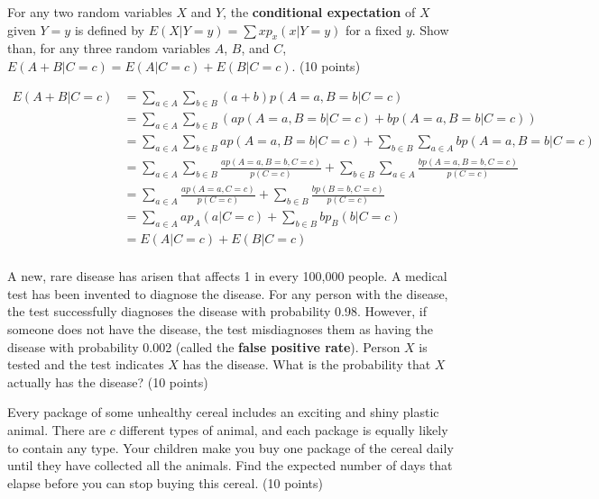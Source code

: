 \documentclass[fleqn]{homework}
\begin{document}
  \begin{problem}{3}
    \begin{question}
      For any two random variables $X$ and $Y$, the \textbf{conditional
        expectation} of $X$ given $Y=y$ is defined by
      $E(X|Y=y) = \sum x p_x(x|Y=y)$ for a fixed $y$.  Show than, for any three
      random variables $A$, $B$, and $C$, $E(A+B|C=c) = E(A|C=c) +
      E(B|C=c)$. (10 points)
    \end{question}

    \begin{align*}
      E(A + B | C=c) &= \sum_{a\in A} \sum_{b\in B} (a+b)p(A=a,B=b|C=c) \\
                     &= \sum_{a\in A} \sum_{b\in B} \left(a p(A=a,B=b|C=c) + b p(A=a,B=b|C=c) \right) \\
                     &= \sum_{a\in A} \sum_{b\in B} a p(A=a,B=b|C=c) + \sum_{b\in B} \sum_{a\in A} b p(A=a,B=b|C=c) \\
                     &= \sum_{a\in A} \sum_{b\in B} \frac{ap(A=a,B=b,C=c)}{p(C=c)} + \sum_{b\in B} \sum_{a\in A} \frac{bp(A=a,B=b,C=c)}{p(C=c)} \\
                     &= \sum_{a\in A} \frac{ap(A=a,C=c)}{p(C=c)} + \sum_{b\in B} \frac{bp(B=b,C=c)}{p(C=c)} \\
                     &= \sum_{a\in A} a p_A(a|C=c) + \sum_{b\in B} bp_B(b|C=c) \\
                     &= E(A|C=c) + E(B|C=c) \\
    \end{align*}
  \end{problem}

  \begin{problem}{4}
    \begin{question}
      A new, rare disease has arisen that affects 1 in every 100,000 people.  A
      medical test has been invented to diagnose the disease.  For any person
      with the disease, the test successfully diagnoses the disease with
      probability 0.98.  However, if someone does not have the disease, the test
      misdiagnoses them as having the disease with probability 0.002 (called the
      \textbf{false positive rate}).  Person $X$ is tested and the test
      indicates $X$ has the disease.  What is the probability that $X$ actually
      has the disease? (10 points)
    \end{question}
  \end{problem}

  \begin{problem}{5}
    \begin{question}
      Every package of some unhealthy cereal includes an exciting and shiny
      plastic animal.  There are $c$ different types of animal, and each package
      is equally likely to contain any type.  Your children make you buy one
      package of the cereal daily until they have collected all the animals.
      Find the expected number of days that elapse before you can stop buying
      this cereal. (10 points)
    \end{question}
  \end{problem}
\end{document}

